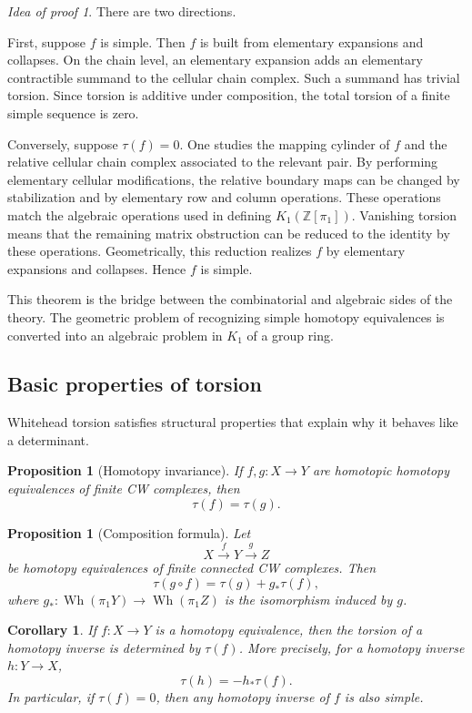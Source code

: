 \documentclass[11pt,a4paper]{article}
\newcommand{\Wh}{\operatorname{Wh}}
\newcommand{\ZZ}{\mathbb{Z}}
\theoremstyle{definition}
\theoremstyle{plain}
\newtheorem{proposition}[definition]{Proposition}
\newtheorem{corollary}[definition]{Corollary}
\theoremstyle{remark}
\newtheorem*{proofidea}{Idea of proof}
\begin{document}
\begin{proofidea}
There are two directions.

First, suppose \(f\) is simple. Then \(f\) is built from elementary expansions and collapses. On the chain level, an elementary expansion adds an elementary contractible summand to the cellular chain complex. Such a summand has trivial torsion. Since torsion is additive under composition, the total torsion of a finite simple sequence is zero.

Conversely, suppose \(\tau(f)=0\). One studies the mapping cylinder of \(f\) and the relative cellular chain complex associated to the relevant pair. By performing elementary cellular modifications, the relative boundary maps can be changed by stabilization and by elementary row and column operations. These operations match the algebraic operations used in defining \(K_1(\ZZ[\pi_1])\). Vanishing torsion means that the remaining matrix obstruction can be reduced to the identity by these operations. Geometrically, this reduction realizes \(f\) by elementary expansions and collapses. Hence \(f\) is simple.
\end{proofidea}

This theorem is the bridge between the combinatorial and algebraic sides of the theory. The geometric problem of recognizing simple homotopy equivalences is converted into an algebraic problem in \(K_1\) of a group ring.

\subsection{Basic properties of torsion}

Whitehead torsion satisfies structural properties that explain why it behaves like a determinant.

\begin{proposition}[Homotopy invariance]
If \(f,g:X\to Y\) are homotopic homotopy equivalences of finite CW complexes, then
\[
  \tau(f)=\tau(g).
\]
\end{proposition}

\begin{proposition}[Composition formula]
Let
\[
  X\xrightarrow{f}Y\xrightarrow{g}Z
\]
be homotopy equivalences of finite connected CW complexes. Then
\[
  \tau(g\circ f)=\tau(g)+g_*\tau(f),
\]
where \(g_*:\Wh(\pi_1Y)\to\Wh(\pi_1Z)\) is the isomorphism induced by \(g\).
\end{proposition}

\begin{corollary}
If \(f:X\to Y\) is a homotopy equivalence, then the torsion of a homotopy inverse is determined by \(\tau(f)\). More precisely, for a homotopy inverse \(h:Y\to X\),
\[
  \tau(h)=-h_*\tau(f).
\]
In particular, if \(\tau(f)=0\), then any homotopy inverse of \(f\) is also simple.
\end{corollary}
\end{document}
